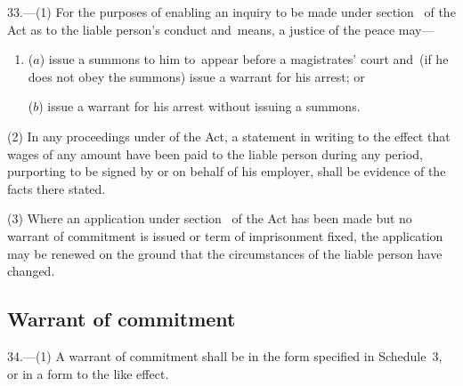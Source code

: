 \documentclass[12pt,a4paper]{article}
\begin{document}
33.—(1) For the purposes of enabling an inquiry to be made under section~%
of the Act as to the liable person’s conduct and~means, a justice of the peace 
may—
\begin{enumerate}\item[]
($a$) issue a summons to him to~appear before a magistrates' court and~(if he does not obey the summons) issue a warrant for his arrest; or

($b$) issue a warrant for his arrest without issuing a summons.
\end{enumerate}

(2) In any proceedings under 
of the Act, a statement in writing to the effect that wages of any amount have been paid to the liable person during any period, purporting to be signed by or on behalf of his employer, shall be evidence of the facts there stated.

(3) Where an application under section~
of the Act has been made but no warrant of commitment is issued or term of imprisonment fixed, the application may be renewed on the ground that the circumstances of the liable person have changed.


\subsection[34. Warrant of commitment]{Warrant of commitment}

34.—(1) A warrant of commitment shall be in the form specified in Schedule~3, or in a form to the like effect.
\end{document}
